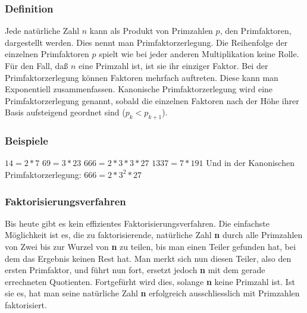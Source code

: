 \subsubsection{Definition}
Jede natürliche Zahl $n$ kann als Produkt von Primzahlen $p$, den Primfaktoren, dargestellt werden. Dies nennt man Primfaktorzerlegung. Die Reihenfolge der einzelnen Primfaktoren $p$ spielt wie bei jeder anderen Multiplikation keine Rolle. Für den Fall, daß $n$ eine Primzahl ist, ist sie ihr einziger Faktor. Bei der Primfaktorzerlegung können Faktoren mehrfach auftreten. Diese kann man Exponentiell zusammenfassen. Kanonische Primfaktorzerlegung wird eine Primfaktorzerlegung genannt, sobald die einzelnen Faktoren nach der Höhe ihrer Basis aufsteigend geordnet sind ($p_k < p_{k+1}$).
\subsubsection{Beispiele}
$14 = 2 * 7$\newline
$69 = 3 * 23$\newline
$666 = 2 * 3 * 3 * 27$\newline
$1337 = 7 * 191$\newline\newline
Und in der Kanonischen Primfaktorzerlegung:\newline\newline
$666 = 2 * 3^2 * 27$
\subsubsection{Faktorisierungsverfahren}
Bis heute gibt es kein effizientes Faktorisierungsverfahren. Die einfachste Möglichkeit ist es, die zu faktorisierende, natürliche Zahl \textbf{n} durch alle Primzahlen von Zwei bis zur Wurzel von \textbf{n} zu teilen, bis man einen Teiler gefunden hat, bei dem das Ergebnis keinen Rest hat. Man merkt sich nun diesen Teiler, also den ersten Primfaktor, und führt nun fort, ersetzt jedoch \textbf{n} mit dem gerade errechneten Quotienten. Fortgefürht wird dies, solange \textbf{n} keine Primzahl ist. Ist sie es, hat man seine natürliche Zahl \textbf{n} erfolgreich ausschliesslich mit Primzahlen faktorisiert.
